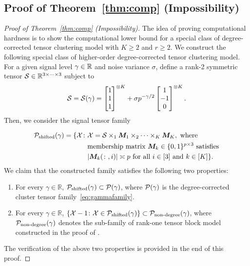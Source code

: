 \documentclass[journal]{IEEEtran}
\theoremstyle{definition}
\theoremstyle{definition}
\begin{document}
\subsection{Proof of Theorem~\ref{thm:comp} (Impossibility)}\label{sec:compprove1}


\begin{proof}[Proof of Theorem~\ref{thm:comp} (Impossibility)]
The idea of proving computational hardness is to show the computational lower bound for a special class of degree-corrected tensor clustering model with $K\geq 2$ {and $ r \geq 2$}. We construct the following special class of higher-order degree-corrected tensor clustering  model. For a given signal level $\gamma\in\mathbb{R}$ and noise variance $\sigma$, define a rank-2 symmetric tensor $\mathcal{S}\in\mathbb{R}^{3\times \cdots\times 3}$ subject to
\begin{equation}\label{eq:S}
\tS=\tS(\gamma) = \begin{bmatrix}
		1\\
		1\\
		1
		\end{bmatrix}^{\otimes K}
+\sigma p^{-\gamma/2} \begin{bmatrix}
		1\\
		-1\\
		0
	\end{bmatrix}^{\otimes K}.
\end{equation}
Then, we consider the signal tensor family

\vspace{-0.5cm}
\small
\begin{align}
\mathcal{P}_{\text{shifted}}(\gamma)=\{\mathcal{X}\colon  &\mathcal{X}=\mathcal{S}\times_1\bm M_1\times_2 \cdots \times_K\bm M_K,\ \text{where}  \\
& \text{membership matrix $\bm M_k\in\{0,1\}^{p\times 3}$ satisfies} \\
 &\text{$|\bm M_k(\colon,i)|\asymp p$ for all $i\in[3]$ and $k\in[K]$}\}.\\
\end{align}
\normalsize
We claim that the constructed family satisfies the following two properties:
\begin{enumerate}[wide,label=(\roman*)]
    \item For every $\gamma\in \mathbb{R}$, $\mathcal{P}_{\text{shifted}}(\gamma)\subset \mathcal{P}(\gamma)$, where $\mathcal{P}(\gamma)$ is the degree-corrected cluster tensor family~\eqref{eq:gammafamily}.
    \item For every $\gamma\in \mathbb{R}$, $\{\mathcal{X}-1\colon \mathcal{X}\in \mathcal{P}_{\text{shifted}}(\gamma)\}\subset \mathcal{P}_{\text{non-degree}}(\gamma)$, where $\mathcal{P}_{\text{non-degree}}(\gamma)$ denotes the sub-family of rank-one tensor block model constructed in the proof of \cite[Theorem 7]{han2020exact}. 
\end{enumerate}
The verification of the above two properties is provided in the end of this proof. 


\end{proof}
\end{document}
